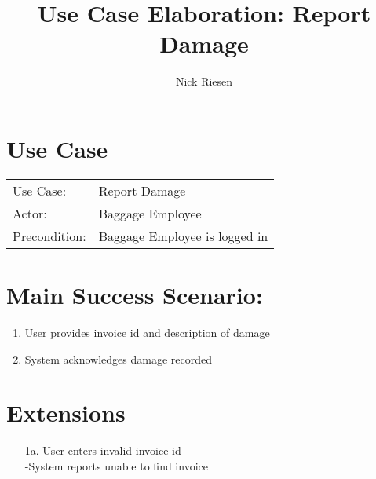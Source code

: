 \documentclass{article}
\title{Use Case Elaboration: Report Damage}
\author{ Nick Riesen }
\begin{document}
\maketitle


\section*{Use Case}
\begin{tabular}{l l}
Use Case:     & Report Damage                \\
Actor:        & Baggage Employee              \\
Precondition: & Baggage Employee is logged in \\
\end{tabular}


\section*{Main Success Scenario:}

\begin{enumerate}
    \item  User provides invoice id and description of damage
    \item System acknowledges damage recorded

\end{enumerate}

\section*{Extensions}

\begin{itemize}
    \item [1a.] User enters invalid invoice id \\
        -System reports unable to find invoice

\end{itemize}
\end{document}
